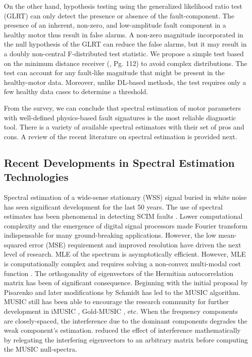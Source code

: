 On the other hand, hypothesis testing using the generalized likelihood ratio test (GLRT) \cite{elbouchikhi2017motor, trachi2016novel} can only detect the presence or absence of the fault-component. The presence of an inherent, non-zero, and low-amplitude fault component in a healthy motor thus result in false alarms. A non-zero magnitude incorporated in the null hypothesis of the GLRT can reduce the false alarms, but it may result in a doubly non-central F-distributed test statistic. We propose a simple test based on the minimum distance receiver (\cite{kay1998fundamentals}, Pg. 112) to avoid complex distributions. The test can account for any fault-like magnitude that might be present in the healthy-motor data. Moreover, unlike DL-based methods, the test requires only a few healthy data cases to determine a threshold.

From the survey, we can conclude that spectral estimation of motor parameters with well-defined physics-based fault signatures is the most reliable diagnostic tool. There is a variety of available spectral estimators with their set of pros and cons. A review of the recent literature on spectral estimation is provided next.
 
\subsection{Recent Developments in Spectral Estimation Technologies}
Spectral estimation of a wide-sense stationary (WSS) signal buried in white noise has seen significant development for the last 50 years. The use of spectral estimates has been phenomenal in detecting SCIM faults \cite{samanta2018fast}. Lower computational complexity and the emergence of digital signal processors made Fourier transform indispensable for many ground-breaking applications. However, the low mean-squared error (MSE) requirement and improved resolution have driven the next level of research. MLE of the spectrum is asymptotically efficient. However, MLE is computationally complex and requires solving a non-convex multi-modal cost function \cite{trinh2018partial}. The orthogonality of eigenvectors of the Hermitian autocorrelation matrix has been of significant consequence. Beginning with the initial proposal by Pisarenko and later modifications by Schmidt has led to the MUSIC \cite{schmidt1986multiple} algorithm. MUSIC still has been able to encourage the research community for further development in iMUSIC \cite{tenneti2019imusic}, Gold-MUSIC \cite{rangarao2013gold}, etc. When the frequency components are closely-spaced, the interference due to the dominant components degrades the weak component's estimation. \cite{trinh2018partial} reduced the effect of interference mathematically by relegating the interfering eigenvectors to an arbitrary matrix before computing the MUSIC null-spectra. 


